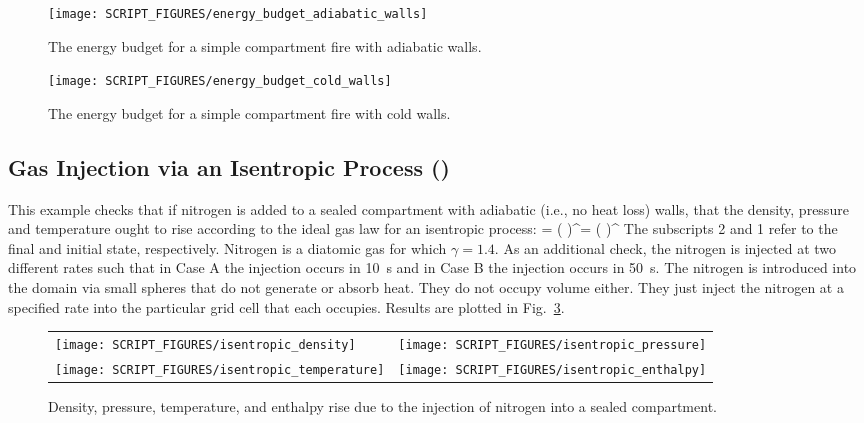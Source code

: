 \documentclass[11pt]{book}
\begin{document}
\begin{figure}[ht]
\centering
\texttt{[image: SCRIPT\_FIGURES/energy\_budget\_adiabatic\_walls]}
\caption[The  test case]{The energy budget for a simple compartment fire with adiabatic walls.}
\label{energy_budget_adiabatic_walls_fig}
\end{figure}

\begin{figure}[ht]
\centering
\texttt{[image: SCRIPT\_FIGURES/energy\_budget\_cold\_walls]}
\caption[The  test case]{The energy budget for a simple compartment fire with cold walls.}
\label{energy_budget_cold_walls_fig}
\end{figure}


\subsection{Gas Injection via an Isentropic Process (\texorpdfstring{}{isentropic})}
\label{isentropic}

This example checks that if nitrogen is added to a sealed compartment with adiabatic (i.e., no heat loss) walls, that the density, pressure and temperature ought to rise according to the ideal gas law for an isentropic process: \be {} = \left(  \right)^\gamma = \left(  \right)^{}  \ee The subscripts 2 and 1 refer to the final and initial state, respectively. Nitrogen is a diatomic gas for which $\gamma=1.4$. As an additional check, the nitrogen is injected at two different rates such that in Case A the injection occurs in 10~s and in Case B the injection occurs in 50~s. The nitrogen is introduced into the domain via small spheres that do not generate or absorb heat. They do not occupy volume either. They just inject the nitrogen at a specified rate into the particular grid cell that each occupies.  Results are plotted in Fig.~\ref{isentropic_fig}.

\begin{figure}[ht]
\begin{tabular*}{\textwidth}{lr}
\texttt{[image: SCRIPT\_FIGURES/isentropic\_density]} &
\texttt{[image: SCRIPT\_FIGURES/isentropic\_pressure]} \\
\texttt{[image: SCRIPT\_FIGURES/isentropic\_temperature]} &
\texttt{[image: SCRIPT\_FIGURES/isentropic\_enthalpy]}
\end{tabular*}
\caption[The  test case]{Density, pressure, temperature, and enthalpy rise due to the injection of nitrogen into a sealed compartment.}
\label{isentropic_fig}
\end{figure}
\end{document}
